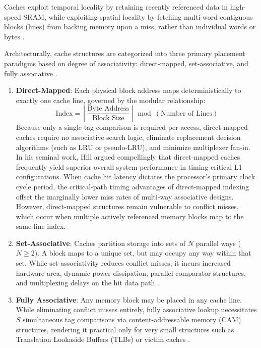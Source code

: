 \documentclass[conference]{IEEEtran}
\begin{document}
Caches exploit temporal locality by retaining recently referenced data in high-speed SRAM, while exploiting spatial locality by fetching multi-word contiguous blocks (lines) from backing memory upon a miss, rather than individual words or bytes \cite{patterson2020computer}.

Architecturally, cache structures are categorized into three primary placement paradigms based on degree of associativity: direct-mapped, set-associative, and fully associative \cite{hennessy2019computer}.
\begin{enumerate}
    \item \textbf{Direct-Mapped}: Each physical block address maps deterministically to exactly one cache line, governed by the modular relationship:
    \begin{equation}
        \text{Index} = \left\lfloor\frac{\text{Byte Address}}{\text{Block Size}}\right\rfloor \bmod (\text{Number of Lines})
    \end{equation}
    Because only a single tag comparison is required per access, direct-mapped caches require no associative search logic, eliminate replacement decision algorithms (such as LRU or pseudo-LRU), and minimize multiplexer fan-in. In his seminal work, Hill \cite{hill1988case} argued compellingly that direct-mapped caches frequently yield superior overall system performance in timing-critical L1 configurations. When cache hit latency dictates the processor's primary clock cycle period, the critical-path timing advantages of direct-mapped indexing offset the marginally lower miss rates of multi-way associative designs. However, direct-mapped structures remain vulnerable to conflict misses, which occur when multiple actively referenced memory blocks map to the same line index.
    \item \textbf{Set-Associative}: Caches partition storage into sets of $N$ parallel ways ($N \ge 2$). A block maps to a unique set, but may occupy any way within that set. While set-associativity reduces conflict misses, it incurs increased hardware area, dynamic power dissipation, parallel comparator structures, and multiplexing delays on the hit data path \cite{hennessy2019computer}.
    \item \textbf{Fully Associative}: Any memory block may be placed in any cache line. While eliminating conflict misses entirely, fully associative lookup necessitates $S$ simultaneous tag comparisons via content-addressable memory (CAM) structures, rendering it practical only for very small structures such as Translation Lookaside Buffers (TLBs) or victim caches \cite{smith1982cache, jouppi1990improving}.
\end{enumerate}
\end{document}
